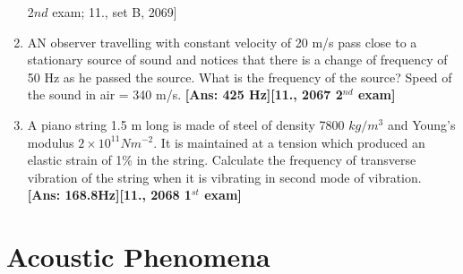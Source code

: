 \documentclass[a4paper,10pt]{report}
\begin{document}
\begin{enumerate}
{    2${nd}$ exam; 11., set B, 2069]}
   \item AN observer travelling with constant velocity of 20 m/s pass close to a stationary source of sound and notices that
    there is a change of frequency of 50 Hz as he passed the source. What is the frequency of the source? Speed of the sound 
    in air = 340 m/s. \textbf{[Ans: 425 Hz][11., 2067 2$^{nd}$ exam]}
   \item A piano string 1.5 m long is made of steel of density 7800 $kg/m^{3}$ and Young's modulus $2\times10^{11} Nm^{-2}$. 
    It is maintained at a tension which produced an elastic strain of 1\%{} in the string. Calculate the frequency of transverse
    vibration of the string when it is vibrating in second mode of vibration. \textbf{[Ans: 168.8Hz][11., 2068 1$^{st}$ exam]}
  \end{enumerate}

\section{Acoustic Phenomena}
\end{document}
